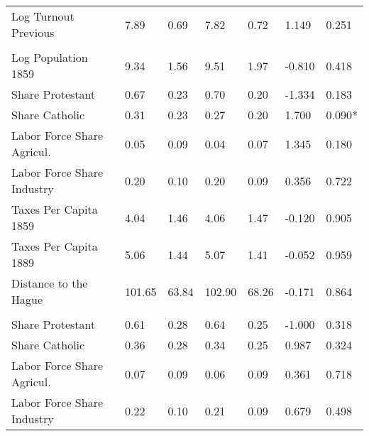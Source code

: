 \begin{table}[!h]
{\begin{threeparttable}
\begin{tabular}[t]{lllllll}
\hspace{1em}Log Turnout Previous & \num{7.89} & \num{0.69} & \num{7.82} & \num{0.72} & 1.149 & 0.251\\
\addlinespace[0.3em]
\multicolumn{7}{l}{\textbf{Panel D: Birthplace Characteristics}}\\
\hspace{1em}Log Population 1859 & \num{9.34} & \num{1.56} & \num{9.51} & \num{1.97} & -0.810 & 0.418\\
\hspace{1em}Share Protestant & \num{0.67} & \num{0.23} & \num{0.70} & \num{0.20} & -1.334 & 0.183\\
\hspace{1em}Share Catholic & \num{0.31} & \num{0.23} & \num{0.27} & \num{0.20} & 1.700 & 0.090*\\
\hspace{1em}Labor Force Share Agricul. & \num{0.05} & \num{0.09} & \num{0.04} & \num{0.07} & 1.345 & 0.180\\
\hspace{1em}Labor Force Share Industry & \num{0.20} & \num{0.10} & \num{0.20} & \num{0.09} & 0.356 & 0.722\\
\hspace{1em}Taxes Per Capita 1859 & \num{4.04} & \num{1.46} & \num{4.06} & \num{1.47} & -0.120 & 0.905\\
\hspace{1em}Taxes Per Capita 1889 & \num{5.06} & \num{1.44} & \num{5.07} & \num{1.41} & -0.052 & 0.959\\
\hspace{1em}Distance to the Hague & \num{101.65} & \num{63.84} & \num{102.90} & \num{68.26} & -0.171 & 0.864\\
\addlinespace[0.3em]
\multicolumn{7}{l}{\textbf{Panel E: District Characteristics}}\\
\hspace{1em}Share Protestant & \num{0.61} & \num{0.28} & \num{0.64} & \num{0.25} & -1.000 & 0.318\\
\hspace{1em}Share Catholic & \num{0.36} & \num{0.28} & \num{0.34} & \num{0.25} & 0.987 & 0.324\\
\hspace{1em}Labor Force Share Agricul. & \num{0.07} & \num{0.09} & \num{0.06} & \num{0.09} & 0.361 & 0.718\\
\hspace{1em}Labor Force Share Industry & \num{0.22} & \num{0.10} & \num{0.21} & \num{0.09} & 0.679 & 0.498\\

\end{tabular}
\end{threeparttable}}
\end{table}
